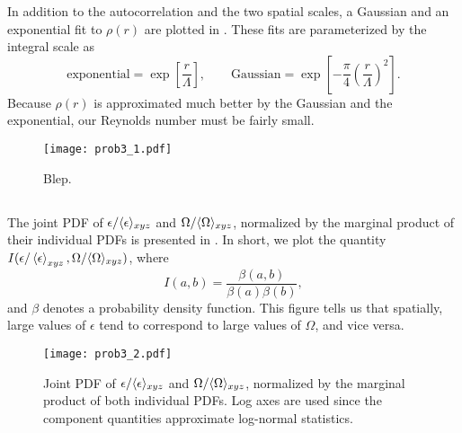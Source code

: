 \documentclass[11pt]{article}
\begin{document}
In addition to the autocorrelation and the two spatial scales, a Gaussian and an exponential fit to $\rho(r)$ are plotted in . These fits are parameterized by the integral scale as
\[
\text{exponential} = \exp \left[ \frac{r}{\Lambda} \right]
,
\qquad
\text{Gaussian} = \exp \left[ - \frac{\pi}{4} \left( \frac{r}{\Lambda} \right)^2 \right]
.
\]
Because $\rho(r)$ is approximated much better by the Gaussian and the exponential, our Reynolds number must be fairly small.

\begin{figure}[t]
\centering
\texttt{[image: prob3\_1.pdf]}
\\[6pt]
\caption{Blep.}
\label{fig:prob_3_1_autocorrelation}
\end{figure}

\subsection{}

The joint PDF of $\epsilon / \langle \epsilon \rangle_{xyz}$ and $\Omega / \langle \Omega \rangle_{xyz}$, normalized by the marginal product of their individual PDFs is presented in . In short, we plot the quantity $I( \epsilon / \left< \epsilon \right>_{xyz}, \Omega / \langle \Omega \rangle_{xyz})$, where
\begin{equation}
I(a,b) = \frac{\beta(a,b)}{\beta(a) \beta(b)}
,
\end{equation}
and $\beta$ denotes a probability density function. This figure tells us that spatially, large values of $\epsilon$ tend to correspond to large values of $\Omega$, and vice versa.

\begin{figure}[h]
\centering
\texttt{[image: prob3\_2.pdf]}
\\[6pt]
\caption{Joint PDF of $\epsilon / \langle \epsilon \rangle_{xyz}$ and $\Omega / \langle \Omega \rangle_{xyz}$, normalized by the marginal product of both individual PDFs. Log axes are used since the component quantities approximate log-normal statistics.}
\label{fig:prob_3_2_joint_pdf}
\end{figure}

\end{document}

